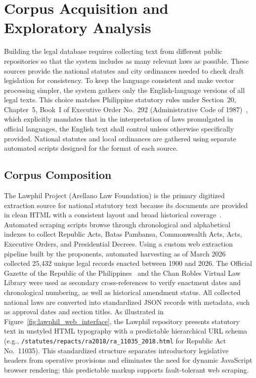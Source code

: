 \section{Corpus Acquisition and Exploratory Analysis}
    \label{sec:corpus_acquisition}
    Building the legal database requires collecting text from different public repositories so that the system includes as many relevant laws as possible. These sources provide the national statutes and city ordinances needed to check draft legislation for consistency. To keep the language consistent and make vector processing simpler, the system gathers only the English-language versions of all legal texts. This choice matches Philippine statutory rules under Section~20, Chapter~5, Book~I of Executive Order No.~292 (Administrative Code of 1987)~\cite{philgov1987eo292}, which explicitly mandates that in the interpretation of laws promulgated in official languages, the English text shall control unless otherwise specifically provided. National statutes and local ordinances are gathered using separate automated scripts designed for the format of each source.

        \subsection{Corpus Composition}
        The Lawphil Project (Arellano Law Foundation) is the primary digitized extraction source for national statutory text because its documents are provided in clean HTML with a consistent layout and broad historical coverage~\cite{lawphil2000}. Automated scraping scripts browse through chronological and alphabetical indexes to collect Republic Acts, Batas Pambansa, Commonwealth Acts, Acts, Executive Orders, and Presidential Decrees. Using a custom web extraction pipeline built by the proponents, automated harvesting as of March 2026 collected 25,432 unique legal records enacted between 1900 and 2026. The Official Gazette of the Republic of the Philippines~\cite{officialgazette} and the Chan Robles Virtual Law Library were used as secondary cross-references to verify enactment dates and chronological numbering, as well as historical amendment status. All collected national laws are converted into standardized JSON records with metadata, such as approval dates and section titles. As illustrated in Figure~\ref{fig:lawphil_web_interface}, the Lawphil repository presents statutory text in unstyled HTML typography with a predictable hierarchical URL schema (e.g., \texttt{/statutes/repacts/ra2018/ra\_11035\_2018.html} for Republic Act No.~11035). This standardized structure separates introductory legislative headers from operative provisions and eliminates the need for dynamic JavaScript browser rendering; this predictable markup supports fault-tolerant web scraping.

